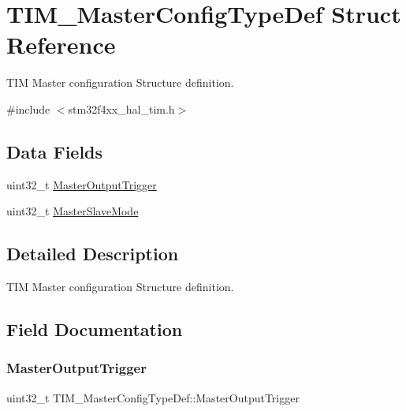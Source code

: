 \hypertarget{struct_t_i_m___master_config_type_def}{}\section{T\+I\+M\+\_\+\+Master\+Config\+Type\+Def Struct Reference}
\label{struct_t_i_m___master_config_type_def}


T\+IM Master configuration Structure definition.  




{\ttfamily \#include $<$stm32f4xx\+\_\+hal\+\_\+tim.\+h$>$}

\subsection*{Data Fields}
\begin{DoxyCompactItemize}
\item 
uint32\+\_\+t \hyperlink{struct_t_i_m___master_config_type_def_a908a6c1b46cb203c0b8b59b490e1114e}{Master\+Output\+Trigger}
\item 
uint32\+\_\+t \hyperlink{struct_t_i_m___master_config_type_def_a45ddfca310a1180e19fc24b36f8e9585}{Master\+Slave\+Mode}
\end{DoxyCompactItemize}


\subsection{Detailed Description}
T\+IM Master configuration Structure definition. 

\subsection{Field Documentation}
\mbox{\label{struct_t_i_m___master_config_type_def_a908a6c1b46cb203c0b8b59b490e1114e}} 
\subsubsection{\texorpdfstring{Master\+Output\+Trigger}{MasterOutputTrigger}}
{\footnotesize\ttfamily uint32\+\_\+t T\+I\+M\+\_\+\+Master\+Config\+Type\+Def\+::\+Master\+Output\+Trigger}

